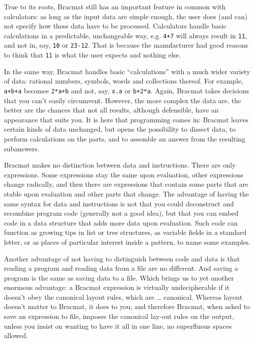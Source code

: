 \documentclass[12pt]{article}
\begin{document}
True to its roots, Bracmat still has an important feature in common
with calculators: as long as the input data are simple enough, the
user does (and can) not specify how these data have to be
processed. Calculators handle basic calculations in a predictable,
unchangeable way, e.g. \verb|4+7| will always result in \verb|11|, and
not in, say, \verb|10| or \verb|23-12|. That is because the
manufacturer had good reasons to think that \verb|11| is what the user
expects and nothing else.

In the same way, Bracmat handles basic ``calculations'' with a much
wider variety of data: rational numbers, symbols, words and
collections thereof. For example, \verb|a+b+a| becomes \verb|2*a+b|
and not, say, \verb|x.a| or \verb|b+2*a|. Again, Bracmat takes
decisions that you can't easily circumvent. However, the more complex
the data are, the better are the chances that not all results,
although defensible, have an appearance that suits you. It is here
that programming comes in: Bracmat leaves certain kinds of data
unchanged, but opens the possibility to dissect data, to perform
calculations on the parts, and to assemble an answer from the
resulting subanswers.

Bracmat makes no distinction between data and instructions. There
are only expressions. Some expressions stay the same upon evaluation,
other expressions change radically, and then there are expressions
that contain some parts that are stable upon evaluation and other
parts that change. The advantage of having the same syntax for data
and instructions is not that you could deconstruct
and recombine program code (generally not a good idea), but that you
can embed code in a data structure that adds more data upon
evaluation. Such code can function as growing tips in list or tree
structures, as variable fields in a standard letter, or as places of
particular interest inside a pattern, to name some examples.

Another advantage of not having to distinguish between code and data
is that reading a program and reading data from a file are no
different. And saving a program is the same as saving data to a
file. Which brings us to yet another enormous advantage: a Bracmat
expression is virtually undecipherable if it doesn't obey the
canonical layout rules, which are \ldots{} canonical. Whereas layout
doesn't matter to Bracmat, it does to you, and therefore Bracmat, when
asked to save an expression to file, imposes the canonical lay-out
rules on the output, unless you insist on wanting to have it all in
one line, no superfluous spaces allowed.
\end{document}
